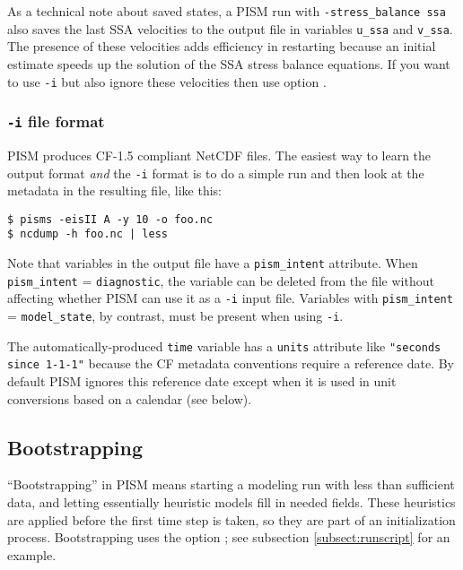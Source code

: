 As a technical note about saved states, a PISM run with \texttt{-stress_balance ssa} also saves the last SSA velocities to the output file in variables \texttt{u_ssa} and \texttt{v_ssa}.  The presence of these velocities adds efficiency in restarting because an initial estimate speeds up the solution of the SSA stress balance equations.  If you want to use \texttt{-i} but also ignore these velocities then use option .

\subsubsection*{\texttt{-i} file format}
\label{sec:i-format}
PISM produces CF-1.5 compliant NetCDF files.  The easiest way to learn the output format \emph{and} the \texttt{-i} format is to do a simple run and then look at the metadata in the resulting file, like this:
\begin{verbatim}
$ pisms -eisII A -y 10 -o foo.nc
$ ncdump -h foo.nc | less
\end{verbatim}

Note that variables in the output file have a \texttt{pism_intent} attribute.  When \texttt{pism_intent} = \texttt{diagnostic}, the variable can be deleted from the file without affecting whether PISM can use it as a \texttt{-i} input file.  Variables with \texttt{pism_intent} = \texttt{model_state}, by contrast, must be present when using \texttt{-i}.

The automatically-produced \texttt{time} variable has a \texttt{units} attribute like \texttt{"seconds since 1-1-1"} because the CF metadata conventions require a reference date.  By default PISM ignores this reference date except when it is used in unit conversions based on a calendar (see below).


\subsection{Bootstrapping}
\label{sec:bootstrapping}

``Bootstrapping'' in PISM means starting a modeling run with less than sufficient data, and letting essentially heuristic models fill in needed fields.  These heuristics are applied before the first time step is taken, so they are part of an initialization process.  Bootstrapping uses the option ; see subsection \ref{subsect:runscript} for an example.

